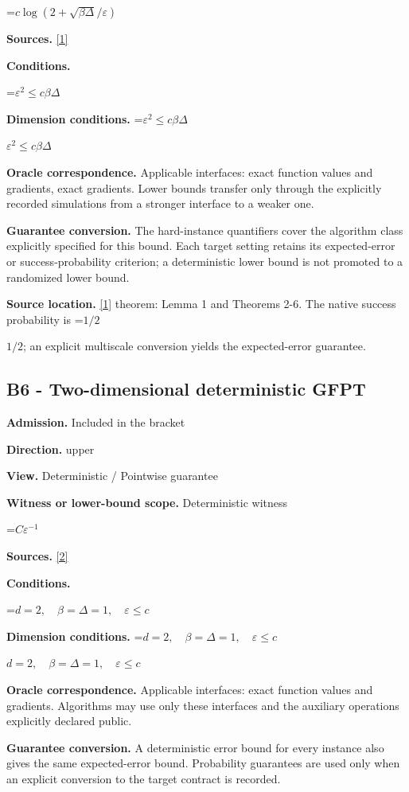 \documentclass[10pt,a4paper]{article}
\newcommand{\AtlasMath}[1]{\par\begingroup\centering\setbox0=\hbox{$\displaystyle #1$}\ifdim\wd0>1.4\linewidth\typeout{ATLAS WIDE FORMULA: \the\wd0}\fi\ifdim\wd0>\linewidth\resizebox{\linewidth}{!}{\box0}\else\box0\fi\par\endgroup}
\newcommand{\AtlasInlineMath}[1]{\begingroup\setbox0=\hbox{$#1$}\ifdim\wd0>.4\linewidth\endgroup\AtlasMath{#1}\else\endgroup$#1$\fi}
\begin{document}
\AtlasMath{c\log(2+\sqrt{\beta\Delta}/\varepsilon)}
\textbf{Sources.} \href{https://arxiv.org/pdf/2209.07513}{[1]}

\textbf{Conditions.} 
\AtlasMath{\varepsilon^2\le c\beta\Delta}


\textbf{Dimension conditions.} \AtlasInlineMath{\varepsilon^2\le c\beta\Delta}

\textbf{Oracle correspondence.} Applicable interfaces: exact function values and gradients, exact gradients. Lower bounds transfer only through the explicitly recorded simulations from a stronger interface to a weaker one.

\textbf{Guarantee conversion.} The hard-instance quantifiers cover the algorithm class explicitly specified for this bound. Each target setting retains its expected-error or success-probability criterion; a deterministic lower bound is not promoted to a randomized lower bound.

\textbf{Source location.} \href{https://arxiv.org/pdf/2209.07513}{[1]} theorem: Lemma 1 and Theorems 2-6. The native success probability is \AtlasInlineMath{1/2}; an explicit multiscale conversion yields the expected-error guarantee.

\subsection{B6 - Two-dimensional deterministic GFPT}
\textbf{Admission.} Included in the bracket

\textbf{Direction.} upper

\textbf{View.} Deterministic / Pointwise guarantee

\textbf{Witness or lower-bound scope.} Deterministic witness

\AtlasMath{C\varepsilon^{-1}}
\textbf{Sources.} \href{https://arxiv.org/pdf/2310.09157}{[2]}

\textbf{Conditions.} 
\AtlasMath{d=2,\quad\beta=\Delta=1,\quad\varepsilon\le c}


\textbf{Dimension conditions.} \AtlasInlineMath{d=2,\quad\beta=\Delta=1,\quad\varepsilon\le c}

\textbf{Oracle correspondence.} Applicable interfaces: exact function values and gradients. Algorithms may use only these interfaces and the auxiliary operations explicitly declared public.

\textbf{Guarantee conversion.} A deterministic error bound for every instance also gives the same expected-error bound. Probability guarantees are used only when an explicit conversion to the target contract is recorded.
\end{document}
